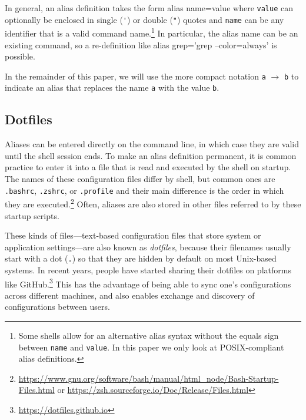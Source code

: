 \documentclass[sigconf,nonacm,screen]{acmart}
\newenvironment{CVerbatim}
  {\center\BVerbatim}
  {\endBVerbatim\endcenter}
\newcommand{\alias}[2]{{\texttt{#1} $\rightarrow$ \texttt{#2}}}
\begin{document}


In general, an alias definition takes the form
\begin{CVerbatim}
alias name=value
\end{CVerbatim}
where \verb|value| can optionally be enclosed in single (\verb|'|) or double (\verb|"|) quotes and \verb|name| can be any identifier that is a valid command name.\footnote{Some shells allow for an alternative alias syntax without the equals sign between \texttt{name} and \texttt{value}. In this paper we only look at POSIX-compliant alias definitions.}
In particular, the alias name can be an existing command, so a re-definition like
\begin{CVerbatim}
alias grep='grep --color=always'
\end{CVerbatim}
is possible.

In the remainder of this paper, we will use the more compact notation \alias{a}{b} to indicate an alias that replaces the name \texttt{a} with the value \texttt{b}.

\subsection{Dotfiles}

Aliases can be entered directly on the command line, in which case they are valid until the shell session ends.
To make an alias definition permanent, it is common practice to enter it into a file that is read and executed by the shell on startup.
The names of these configuration files differ by shell, but common ones are \verb|.bashrc|, \verb|.zshrc|, or \verb|.profile| and their main difference is the order in which they are executed.\footnote{\url{https://www.gnu.org/software/bash/manual/html_node/Bash-Startup-Files.html} or \url{https://zsh.sourceforge.io/Doc/Release/Files.html}}
Often, aliases are also stored in other files referred to by these startup scripts.

These kinds of files---text-based configuration files that store system or application settings---are also known as \emph{dotfiles}, because their filenames usually start with a dot (\verb|.|) so that they are hidden by default on most Unix-based systems.
In recent years, people have started sharing their dotfiles on platforms like GitHub.\footnote{\url{https://dotfiles.github.io}}
This has the advantage of being able to sync one's configurations across different machines, and also enables exchange and discovery of configurations between users.
\end{document}
